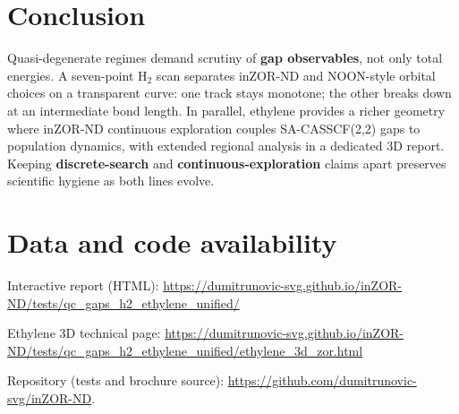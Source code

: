 \documentclass[11pt,a4paper]{article}
\begin{document}
\section{Conclusion}
Quasi-degenerate regimes demand scrutiny of \textbf{gap observables}, not only
total energies. A seven-point H$_2$ scan separates inZOR-ND and NOON-style
orbital choices on a transparent curve: one track stays monotone; the other
breaks down at an intermediate bond length. In parallel, ethylene provides a
richer geometry where inZOR-ND continuous exploration couples SA-CASSCF(2,2)
gaps to population dynamics, with extended regional analysis in a dedicated 3D
report. Keeping \textbf{discrete-search} and \textbf{continuous-exploration}
claims apart preserves scientific hygiene as both lines evolve.

\section*{Data and code availability}
\begin{sloppypar}
Interactive report (HTML):\newline
{\small\url{https://dumitrunovic-svg.github.io/inZOR-ND/tests/qc_gaps_h2_ethylene_unified/}}

Ethylene 3D technical page:\newline
{\small\url{https://dumitrunovic-svg.github.io/inZOR-ND/tests/qc_gaps_h2_ethylene_unified/ethylene_3d_zor.html}}

Repository (tests and brochure source):\newline
{\small\url{https://github.com/dumitrunovic-svg/inZOR-ND}}.
\end{sloppypar}



\end{document}
